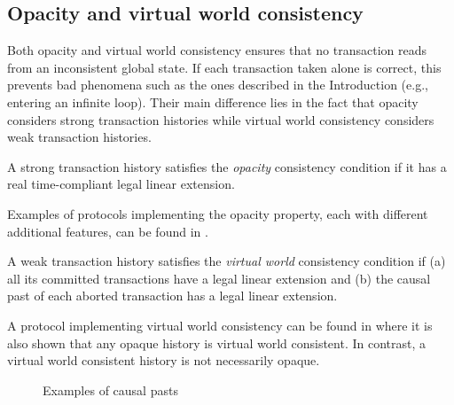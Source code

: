 \subsection{Opacity and virtual world consistency}
Both  opacity and  virtual world  consistency ensures  that  no transaction
reads  from  an  inconsistent global state.  If each transaction taken 
alone is correct, this prevents bad phenomena such as the ones described  
in the Introduction (e.g., entering an infinite loop). 
Their main  difference lies in the  fact that opacity considers strong
transaction histories while virtual world consistency considers 
weak transaction histories. 

\begin{defin}
A strong transaction  history satisfies the  {\it   opacity}  consistency
condition if it has a real time-compliant  legal  linear extension. 
\end{defin}
%

Examples  of  protocols  implementing  the opacity   property,  each  with
different additional features, can be found in \cite{DSS06,IR08,IR09,RFF07}. 


\begin{defin}
A weak transaction  history satisfies the  {\it   virtual world}
consistency condition if 
(a)  all its committed transactions have  a %
legal linear  extension and 
(b) the causal past of each aborted transaction has a legal linear extension. 
\end{defin}


A protocol  implementing   virtual world consistency 
can be found in \cite{IR09} where it is also shown that 
any opaque history is virtual world consistent. In contrast,  
a virtual world  consistent history is not necessarily  opaque.


\begin{figure}[ht!]
\centering
\scalebox{0.30}{}
\caption{Examples of causal pasts}
\label{fig:example-linear-extensions}
\end{figure}




